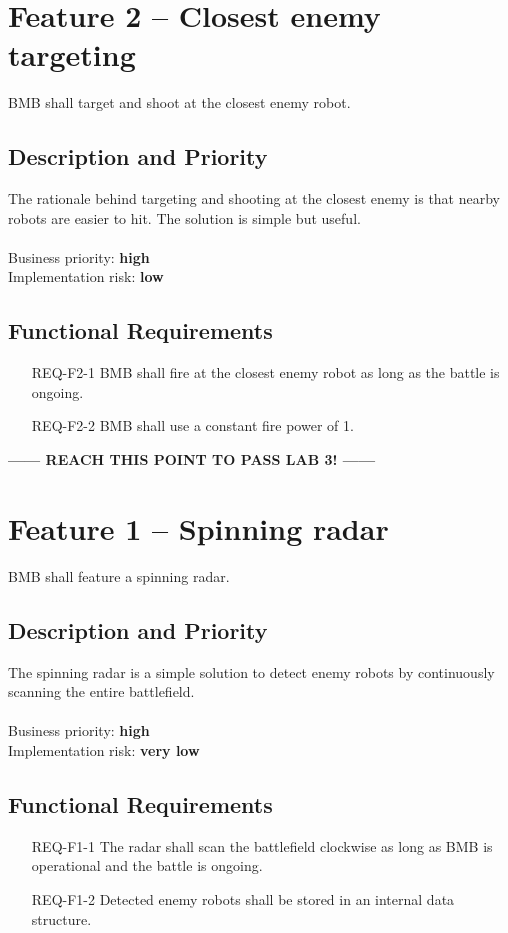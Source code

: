 \documentclass{scrreprt}
\begin{document}
\section{Feature 2 -- Closest enemy targeting}
BMB shall target and shoot at the closest enemy robot.

\subsection{Description and Priority}
The rationale behind targeting and shooting at the closest enemy is that nearby robots are easier to hit. The solution is simple but useful.\\\\Business priority: \textbf{high}\\
Implementation risk: \textbf{low}

\subsection{Functional Requirements}
\begin{itemize}
\item[REQ-F2-1] BMB shall fire at the closest enemy robot as long as the battle is ongoing.
\item[REQ-F2-2] BMB shall use a constant fire power of 1.
\end{itemize}

\begin{center}
\textbf{------ REACH THIS POINT TO PASS LAB 3! ------}
\end{center}

\section{Feature 1 -- Spinning radar}
BMB shall feature a spinning radar.

\subsection{Description and Priority}
The spinning radar is a simple solution to detect enemy robots by continuously scanning the entire battlefield.\\\\Business priority: \textbf{high}\\
Implementation risk: \textbf{very low}

\subsection{Functional Requirements}
\begin{itemize}
\item[REQ-F1-1] The radar shall scan the battlefield clockwise as long as BMB is operational and the battle is ongoing.
\item[REQ-F1-2] Detected enemy robots shall be stored in an internal data structure. 
\end{itemize}
\end{document}
